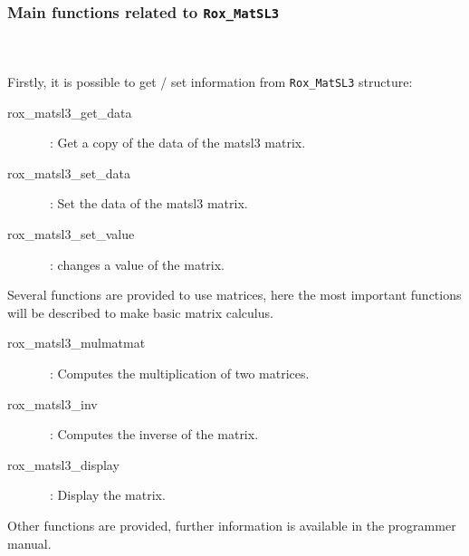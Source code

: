 \subsubsection{Main functions related to {\tt Rox\_MatSL3}}
\label{sss:matsl3_methods}
~\\~\\

Firstly, it is possible to get / set information from \lstinline$Rox_MatSL3$ structure:
\begin{description}
  \item[rox\_matsl3\_get\_data]~: Get a copy of the data of the matsl3 matrix.
  \item[rox\_matsl3\_set\_data]~: Set the data of the matsl3 matrix.
  \item[rox\_matsl3\_set\_value]~: changes a value of the matrix.
\end{description}

Several functions are provided to use matrices, here the most important functions will be described to make basic matrix calculus.
\begin{description}
  \item[rox\_matsl3\_mulmatmat]~: Computes the multiplication of two matrices.
  \item[rox\_matsl3\_inv]~: Computes the inverse of the matrix.
  \item[rox\_matsl3\_display]~: Display the matrix.
\end{description}

Other functions are provided, further information is available in the programmer manual.
